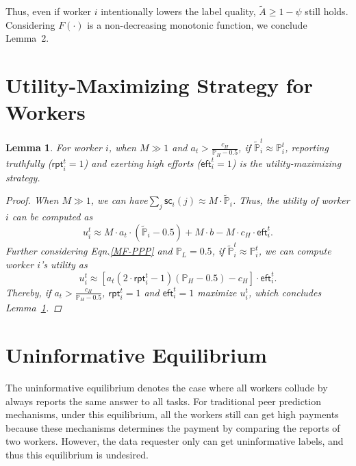 \documentclass{article}
\newtheorem{lemma}[theorem]{Lemma}
\begin{document}
Thus, even if worker $i$ intentionally lowers the label quality, $\tilde{A}\geq 1-\psi$ still holds.
Considering $F(\cdot)$ is a non-decreasing monotonic function, we conclude Lemma~2.

\section{Utility-Maximizing Strategy for Workers}
\begin{lemma}
\label{Strategy}
For worker $i$, when $M\gg 1$ and $a_t>\frac{c_H}{\mathbb{P}_H-0.5}$, if $\tilde{\mathbb{P}}^t_i\approx \mathbb{P}^t_i$, reporting truthfully ($\textsf{rpt}^{t}_i=1$) and exerting high efforts ($\textsf{eft}^{t}_i=1$) is the utility-maximizing strategy.
\begin{proof}
When $M\gg 1$, we can have$\sum_j \textsf{sc}_i(j)\approx M\cdot \tilde{\mathbb{P}}_i$. Thus, the utility of worker $i$ can be computed as
\begin{equation}
u_i^t\approx  M\cdot a_t\cdot (\tilde{\mathbb{P}}_i-0.5) + M\cdot b- M \cdot c_H\cdot \textsf{eft}^{t}_i.
\end{equation}
Further considering Eqn.\ref{MF-PPP} and $\mathbb{P}_L=0.5$, if $\tilde{\mathbb{P}}^t_i\approx \mathbb{P}^t_i$, we can compute worker $i$'s utility as
\begin{equation}
u_i^t\approx [a_t(2\cdot \textsf{rpt}^{t}_i-1)(\mathbb{P}_H-0.5)-c_H]\cdot\textsf{eft}^{t}_i.
\end{equation}
Thereby, if $a_t>\frac{c_H}{\mathbb{P}_H-0.5}$, $\textsf{rpt}^{t}_i=1$ and $\textsf{eft}^{t}_i=1$ maximize $u_i^t$, which concludes Lemma~\ref{Strategy}.
\end{proof}
\end{lemma}

\section{Uninformative Equilibrium}
The uninformative equilibrium denotes the case where all workers collude by always reports the same answer to all tasks.
For traditional peer prediction mechanisms, under this equilibrium, all the workers still can get high payments because these mechanisms determines the payment by comparing the reports of two workers.
However, the data requester only can get uninformative labels, and thus this equilibrium is undesired.
\end{document}
